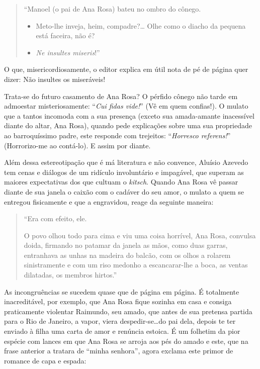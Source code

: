 \documentclass[
  letterpaper,
  DIV=11,
  numbers=noendperiod]{scrreprt}
\begin{document}
\begin{quote}
``Manoel (o pai de Ana Rosa) bateu no ombro do cônego.~

\begin{itemize}
\item
  Meto-lhe inveja, heim, compadre?\ldots{} Olhe como o diacho da pequena
  está faceira, não é?~
\item
  \emph{Ne insultes miseris}!''
\end{itemize}
\end{quote}

O que, misericordiosamente, o editor explica em útil nota de pé de
página quer dizer: Não insultes os miseráveis!

Trata-se do futuro casamento de Ana Rosa? O pérfido cônego não tarde em
admoestar misteriosamente: ``\emph{Cui fidas vide!}'' (Vê em quem
confias!). O mulato que a tantos incomoda com a sua presença (exceto sua
amada-amante inacessível diante do altar, Ana Rosa), quando pede
explicações sobre uma sua propriedade ao barroquíssimo padre, este
responde com trejeitos: ``\emph{Horresco referens!}'' (Horrorizo-me ao
contá-lo). E assim por diante.

Além dessa estereotipação que é má literatura e não convence, Aluísio
Azevedo tem cenas e diálogos de um ridículo involuntário e impagável,
que superam as maiores expectativas dos que cultuam o \emph{kitsch}.
Quando Ana Rosa vê passar diante de sua janela o caixão com o cadáver do
seu amor, o mulato a quem se entregou fisicamente e que a engravidou,
reage da seguinte maneira:

\begin{quote}
``Era com efeito, ele.~

O povo olhou todo para cima e viu uma coisa horrível, Ana Rosa, convulsa
doida, firmando no patamar da janela as mãos, como duas garras,
entranhava as unhas na madeira do balcão, com os olhos a rolarem
sinistramente e com um riso medonho a escancarar-lhe a boca, as ventas
dilatadas, os membros hirtos.''
\end{quote}

As incongruências se sucedem quase que de página em página. É totalmente
inacreditável, por exemplo, que Ana Rosa fique sozinha em casa e consiga
praticamente violentar Raimundo, seu amado, que antes de sua pretensa
partida para o Rio de Janeiro, a vapor, viera despedir-se\ldots do pai
dela, depois te ter enviado à filha uma carta de amor e renúncia
estoica. É um folhetim da pior espécie com lances em que Ana Rosa se
arroja aos pés do amado e este, que na frase anterior a tratara de
``minha senhora'', agora exclama este primor de romance de capa e
espada:
\end{document}
